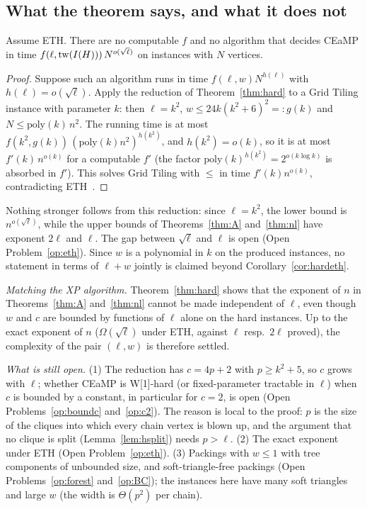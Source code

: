 \subsection{What the theorem says, and what it does not}
\begin{corollary}\label{cor:hardeth}
Assume ETH. There are no computable $f$ and no algorithm that decides CEaMP in time $f(\ell,\mathrm{tw}(I(H)))\,N^{o(\sqrt\ell)}$ on instances with $N$ vertices.
\end{corollary}
\begin{proof}
Suppose such an algorithm runs in time $f(\ell,w)N^{h(\ell)}$ with $h(\ell)=o(\sqrt\ell)$. Apply the reduction of Theorem~\ref{thm:hard} to a Grid Tiling instance with parameter $k$: then $\ell=k^2$, $w\le 24k(k^2+6)^2=:g(k)$ and $N\le \mathrm{poly}(k)\,n^2$. The running time is at most $f(k^2,g(k))\,(\mathrm{poly}(k)n^2)^{h(k^2)}$, and $h(k^2)=o(k)$, so it is at most $f'(k)\,n^{o(k)}$ for a computable $f'$ (the factor $\mathrm{poly}(k)^{h(k^2)}=2^{o(k\log k)}$ is absorbed in $f'$). This solves Grid Tiling with $\le$ in time $f'(k)n^{o(k)}$, contradicting ETH~\cite{Cygan15}.
\end{proof}
Nothing stronger follows from this reduction: since $\ell=k^2$, the lower bound is $n^{o(\sqrt\ell)}$, while the upper bounds of Theorems~\ref{thm:A} and~\ref{thm:nl} have exponent $2\ell$ and $\ell$. The gap between $\sqrt\ell$ and $\ell$ is open (Open Problem~\ref{op:eth}). Since $w$ is a polynomial in $k$ on the produced instances, no statement in terms of $\ell+w$ jointly is claimed beyond Corollary~\ref{cor:hardeth}.

\emph{Matching the XP algorithm.} Theorem~\ref{thm:hard} shows that the exponent of $n$ in Theorems~\ref{thm:A} and~\ref{thm:nl} cannot be made independent of $\ell$, even though $w$ and $c$ are bounded by functions of $\ell$ alone on the hard instances. Up to the exact exponent of $n$ ($\Omega(\sqrt\ell)$ under ETH, against $\ell$ resp.\ $2\ell$ proved), the complexity of the pair $(\ell,w)$ is therefore settled.

\emph{What is still open.} (1) The reduction has $c=4p+2$ with $p\ge k^2+5$, so $c$ grows with $\ell$; whether CEaMP is W[1]-hard (or fixed-parameter tractable in $\ell$) when $c$ is bounded by a constant, in particular for $c=2$, is open (Open Problems~\ref{op:boundc} and~\ref{op:c2}). The reason is local to the proof: $p$ is the size of the cliques into which every chain vertex is blown up, and the argument that no clique is split (Lemma~\ref{lem:hsplit}) needs $p>\ell$. (2) The exact exponent under ETH (Open Problem~\ref{op:eth}). (3) Packings with $w\le1$ with tree components of unbounded size, and soft-triangle-free packings (Open Problems~\ref{op:forest} and~\ref{op:BC}); the instances here have many soft triangles and large $w$ (the width is $\Theta(p^2)$ per chain).

